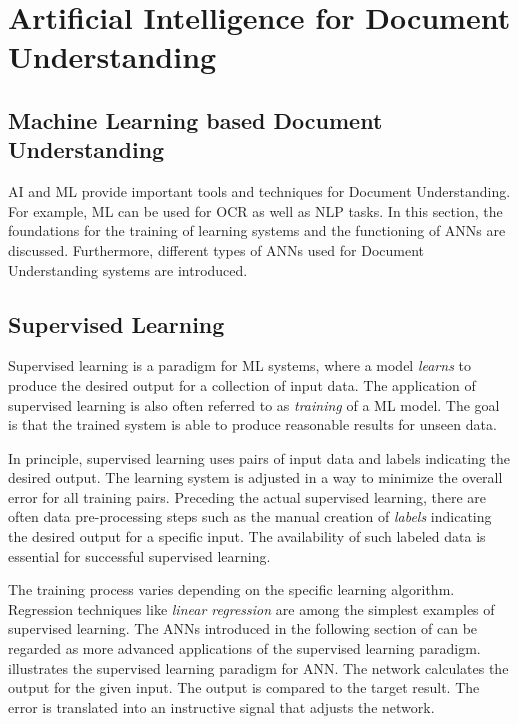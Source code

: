 \newpage
\section{Artificial Intelligence for Document Understanding}
\subsection{Machine Learning based Document Understanding}
\acl{AI} and \acl{ML} provide important tools and techniques for Document Understanding. For example, \ac{ML} can be used for \ac{OCR} as well as \ac{NLP} tasks. In this section, the foundations for the training of learning systems and the functioning of \acfp{ANN} are discussed. Furthermore, different types of \acp{ANN} used for Document Understanding systems are introduced.

\subsection{Supervised Learning}
\label{supervised}
Supervised learning is a paradigm for \ac{ML} systems, where a model \textit{learns} to produce the desired output for a collection of input data. The application of supervised learning is also often referred to as \textit{training} of a \ac{ML} model. The goal is that the trained system is able to produce reasonable results for unseen data.
\cite{haykin2009neural,knudsen1994supervised}

In principle, supervised learning uses pairs of input data and labels indicating the desired output. The learning system is adjusted in a way to minimize the overall error for all training pairs.
Preceding the actual supervised learning, there are often data pre-processing steps such as the manual creation of \textit{labels} indicating the desired output for a specific input. The availability of such labeled data is essential for successful supervised learning.
\cite{haykin2009neural}

The training process varies depending on the specific learning algorithm.
Regression techniques like \textit{linear regression} are among the simplest examples of supervised learning. The \acp{ANN} introduced in the following section of can be regarded as more advanced applications of the supervised learning paradigm. 
 illustrates the supervised learning paradigm for \ac{ANN}. The network calculates the output for the given input. The output is compared to the target result. The error is translated into an instructive signal that adjusts the network. 
\cite{haykin2009neural,knudsen1994supervised}

